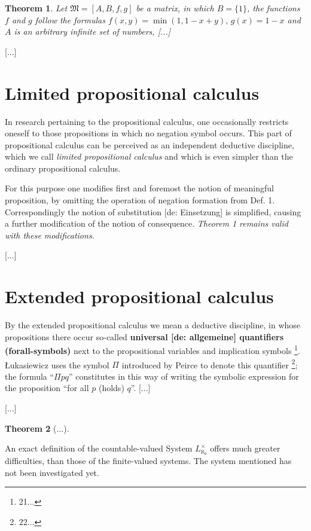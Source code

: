 \documentclass{article}
\newtheorem{theorem}{Theorem}
\theoremstyle{definition}
\begin{document}
\begin{theorem}
  Let $\mathfrak{M}=[A,B,f,g]$ be a matrix, in which $B=\{1\}$, the functions $f$ and $g$ follow the formulas $f(x,y) = \min(1,1-x+y),\, g(x)=1-x$ and $A$ is an arbitrary infinite set of numbers, [...]
\end{theorem}

[...]

\section{Limited propositional calculus}
In research pertaining to the propositional calculus, one occasionally restricts oneself to those propositions in which no negation symbol occurs. This part of propositional calculus can be perceived as an independent deductive discipline, which we call \emph{limited propositional calculus} and which is even simpler than the ordinary propositional calculus.

For this purpose one modifies first and foremost the notion of meaningful proposition, by omitting the operation of negation formation from Def. 1. Correspondingly the notion of substitution [de: Einsetzung] is simplified, causing a further modification of the notion of consequence. \emph{Theorem 1 remains valid with these modifications.}

[...]

\section{Extended propositional calculus}
By the extended propositional calculus we mean a deductive discipline, in whose propositions there occur so-called \textbf{universal [de: allgemeine] quantifiers (forall-symbols)} next to the propositional variables and implication symbols \footnote{21...}. Łukasiewicz uses the symbol $\Pi$ introduced by Peirce to denote this quantifier \footnote{22...}; the formula ``$\Pi pq$'' constitutes in this way of writing the symbolic expression for the proposition ``for all $p$ (holds) $q$''. [...]

[...]

\begin{theorem}  %
  [...]
\end{theorem}

An exact definition of the countable-valued System $L_{\aleph_0}^{\times}$ offers much greater difficulties, than those of the finite-valued systems. The system mentioned has not been investigated yet.
\end{document}
